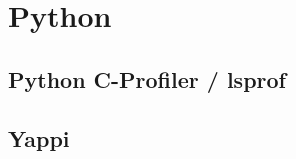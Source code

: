 		\section{Python}
			\subsection{Python C-Profiler / \textunderscore lsprof} 
			\label{subsec:cprofiler}
				
			\subsection{Yappi}
			\label{subsec:yappi}
				
				
				
				
				
				
				
				
				
				
				
				
				
				
				
				
				
				
				
				
				
				
				
				
				
				
				
				
				
				
				
				
				
				